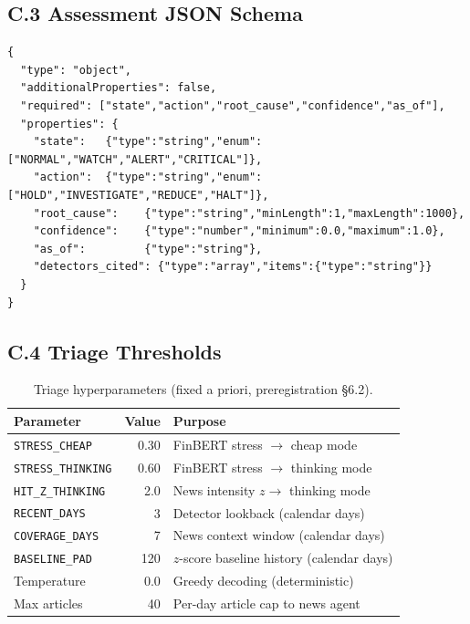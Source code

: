 \documentclass[11pt,a4paper]{article}
\begin{document}
\subsection*{C.3 Assessment JSON Schema}

\begin{Verbatim}[fontsize=\scriptsize, frame=single]
{
  "type": "object",
  "additionalProperties": false,
  "required": ["state","action","root_cause","confidence","as_of"],
  "properties": {
    "state":   {"type":"string","enum":["NORMAL","WATCH","ALERT","CRITICAL"]},
    "action":  {"type":"string","enum":["HOLD","INVESTIGATE","REDUCE","HALT"]},
    "root_cause":    {"type":"string","minLength":1,"maxLength":1000},
    "confidence":    {"type":"number","minimum":0.0,"maximum":1.0},
    "as_of":         {"type":"string"},
    "detectors_cited": {"type":"array","items":{"type":"string"}}
  }
}
\end{Verbatim}

\subsection*{C.4 Triage Thresholds}

\begin{table}[htbp]
\centering
\small
\caption{Triage hyperparameters (fixed a priori, preregistration \S6.2).}
\begin{tabular}{lrl}
\toprule
Parameter & Value & Purpose \\
\midrule
\texttt{STRESS\_CHEAP}    & 0.30 & FinBERT stress $\to$ cheap mode \\
\texttt{STRESS\_THINKING} & 0.60 & FinBERT stress $\to$ thinking mode \\
\texttt{HIT\_Z\_THINKING} & 2.0  & News intensity $z \to$ thinking mode \\
\texttt{RECENT\_DAYS}     & 3    & Detector lookback (calendar days) \\
\texttt{COVERAGE\_DAYS}   & 7    & News context window (calendar days) \\
\texttt{BASELINE\_PAD}    & 120  & $z$-score baseline history (calendar days) \\
Temperature               & 0.0  & Greedy decoding (deterministic) \\
Max articles              & 40   & Per-day article cap to news agent \\
\bottomrule
\end{tabular}
\end{table}
\end{document}
